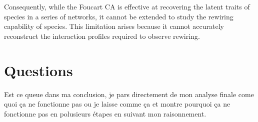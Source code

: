 Consequently, while the Foucart CA is effective at recovering the latent traits of species in a series of networks, it cannot be extended to study the rewiring capability of species. This limitation arises because it cannot accurately reconstruct the interaction profiles required to observe rewiring.



\section{Questions}

Est ce queue dans ma conclusion, je pars directement de mon analyse finale come quoi ça ne fonctionne pas ou je laisse comme ça et montre pourquoi ça ne fonctionne pas en polusieurs étapes en suivant mon raisonnement.